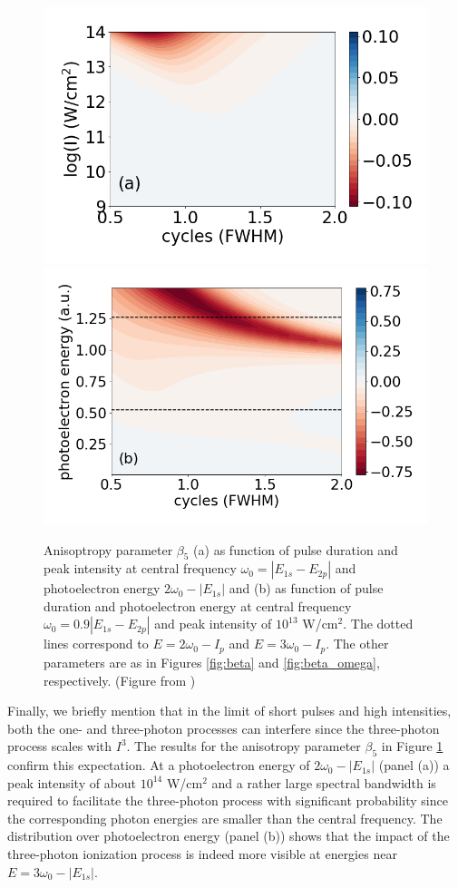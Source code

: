 \begin{figure}[!ht]
\centering
\includegraphics[width=0.4\linewidth]{figs/Photo_ionization/short_pulse/beta_5_heat.png}
\includegraphics[width=0.4\linewidth]{figs/Photo_ionization/short_pulse/energy_d0p9_beta_5_I_2_heat.png}\\
\caption{
Anisoptropy parameter $\beta_5$ (a) as function of pulse duration and peak intensity at central frequency $\omega_0 = |E_{1s}-E_{2p}|$ and photoelectron energy $2\omega_0 - |E_{1s}|$ and (b) as function of pulse duration and photoelectron energy at central frequency $\omega_0 = 0.9|E_{1s}-E_{2p}|$ and peak intensity of $10^{13}$ W/cm$^2$. The dotted lines correspond to $E = 2\omega_0 - I_p$ and $E = 3\omega_0 - I_p$. The other parameters are as in Figures \ref{fig:beta} and \ref{fig:beta_omega}, respectively. (Figure from \cite{venzke2020_ionization})
} 
  \label{fig:beta-3w}
\end{figure}

Finally, we briefly mention that in the limit of short pulses and high intensities, both the one- and three-photon processes can interfere since the three-photon process scales with $I^3$. The results for the anisotropy parameter $\beta_5$ in Figure \ref{fig:beta-3w} confirm this expectation. At a photoelectron energy of $2\omega_0 - |E_{1s}|$ (panel (a)) a peak intensity of about $10^{14}$ W/cm$^2$ and a rather large spectral bandwidth is required to facilitate the three-photon process with significant probability since the corresponding photon energies are smaller than the central frequency. The distribution over photoelectron energy (panel (b)) shows that the impact of the three-photon ionization process is indeed more visible at energies near $E = 3\omega_0 - |E_{1s}|$.

